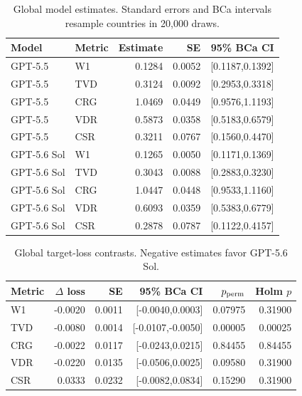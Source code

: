 \begin{table}[!htbp]
\centering
\caption{Global model estimates. Standard errors and BCa intervals resample countries in 20,000 draws.}
\label{tab:global-estimates}
\small
\begin{tabular}{llrrr}
\toprule
\rowcolor{tablehead} Model & Metric & Estimate & SE & 95\% BCa CI \\
\midrule
GPT-5.5 & W1 & 0.1284 & 0.0052 & [0.1187,0.1392] \\
GPT-5.5 & TVD & 0.3124 & 0.0092 & [0.2953,0.3318] \\
GPT-5.5 & CRG & 1.0469 & 0.0449 & [0.9576,1.1193] \\
GPT-5.5 & VDR & 0.5873 & 0.0358 & [0.5183,0.6579] \\
GPT-5.5 & CSR & 0.3211 & 0.0767 & [0.1560,0.4470] \\
GPT-5.6 Sol & W1 & 0.1265 & 0.0050 & [0.1171,0.1369] \\
GPT-5.6 Sol & TVD & 0.3043 & 0.0088 & [0.2883,0.3230] \\
GPT-5.6 Sol & CRG & 1.0447 & 0.0448 & [0.9533,1.1160] \\
GPT-5.6 Sol & VDR & 0.6093 & 0.0359 & [0.5383,0.6779] \\
GPT-5.6 Sol & CSR & 0.2878 & 0.0787 & [0.1122,0.4157] \\
\bottomrule
\end{tabular}
\end{table}
\begin{table}[!htbp]
\centering
\caption{Global target-loss contrasts. Negative estimates favor GPT-5.6 Sol.}
\label{tab:global-contrasts}
\small
\begin{tabular}{lrrrrr}
\toprule
\rowcolor{tablehead} Metric & $\Delta$ loss & SE & 95\% BCa CI & $p_{\rm perm}$ & Holm $p$ \\
\midrule
W1 & -0.0020 & 0.0011 & [-0.0040,0.0003] & 0.07975 & 0.31900 \\
\rowcolor{improvebg}
TVD & -0.0080 & 0.0014 & [-0.0107,-0.0050] & 0.00005 & 0.00025 \\
CRG & -0.0022 & 0.0117 & [-0.0243,0.0215] & 0.84455 & 0.84455 \\
VDR & -0.0220 & 0.0135 & [-0.0506,0.0025] & 0.09580 & 0.31900 \\
CSR & 0.0333 & 0.0232 & [-0.0082,0.0834] & 0.15290 & 0.31900 \\
\bottomrule
\end{tabular}
\end{table}
\FloatBarrier
